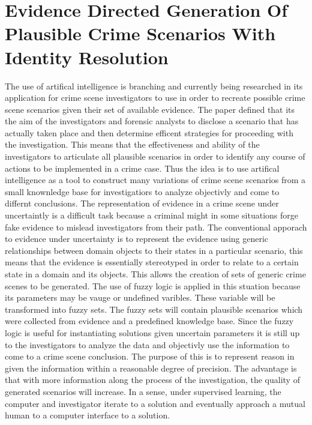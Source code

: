 \documentclass[12pt]{article} %
\begin{document}
\section{Evidence Directed Generation Of Plausible Crime Scenarios With Identity Resolution} %

The use of artifical intelligence is branching and currently being researched in its application for crime scene investigators to use in order to recreate possible crime scene scenarios given their set of available evidence. The paper defined that its the aim of the investigators and forensic analysts to disclose a scenario that has actually taken place and then determine efficent strategies for proceeding with the investigation. This means that the effectiveness and ability of the investigators to articulate all plausible scenarios in order to identify any course of actions to be implemented in a crime case. Thus the idea is to use artifical intelligence as a tool to construct many variations of crime scene scenarios from a small knownledge base for investigatiors to analyze objectivly and come to differnt conclusions. The representation of evidence in a crime scene under uncertaintly is a difficult task because a criminal might in some situations forge fake evidence to mislead investigators from their path. The conventional apporach to evidence under uncertainty is to represent the evidence using generic relationships between domain objects to their states in a particular scenario, this means that the evidence is essentially stereotyped in order to relate to a certain state in a domain and its objects. This allows the creation of sets of generic crime scenes to be generated. The use of fuzzy logic is applied in this stuation because its parameters may be vauge or undefined varibles. These variable will be transformed into fuzzy sets. The fuzzy sets will contain plausible scenarios which were collected from evidence and a predefined knowledge base. Since the fuzzy logic is useful for instantiating solutions given uncertain parameters it is still up to the investigators to analyze the data and objectivly use the information to come to a crime scene conclusion. The purpose of this is to represent reason in given the information within a reasonable degree of precision. The advantage is that with more information along the process of the investigation, the quality of generated scenarios will increase. In a sense, under supervised learning, the computer and investigator iterate to a solution and eventually approach a mutual human to a computer interface to a solution.
\end{document}
